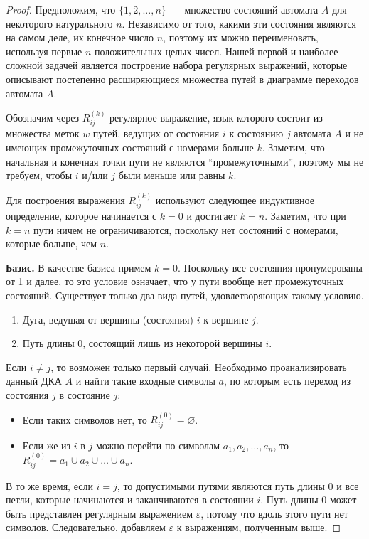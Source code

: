 \documentclass[a4paper,12pt]{article}
\begin{document}
	\begin{proof}
		Предположим, что \(\{1, 2, ..., n\}\)~--- множество состояний автомата \(A\) для некоторого натурального \(n\). Независимо от того, какими эти состояния являются на самом деле, их конечное число \(n\), поэтому их можно переименовать, используя первые \(n\) положительных целых чисел. Нашей первой и наиболее сложной задачей является построение набора регулярных выражений, которые описывают постепенно расширяющиеся множества путей в диаграмме переходов автомата \(A\).
		
		Обозначим через \(R^{(k)}_{ij}\) регулярное выражение, язык которого состоит из множества меток \(w\) путей, ведущих от состояния \(i\) к состоянию \(j\) автомата \(A\) и не имеющих промежуточных состояний с номерами больше \(k\). Заметим, что начальная и конечная точки пути не являются ``промежуточными'', поэтому мы не требуем, чтобы \(i\) и/или \(j\) были меньше или равны \(k\).
		
		Для построения выражения \(R^{(k)}_{ij}\) используют следующее индуктивное определение, которое начинается с \(k = 0\) и достигает \(k = n\). Заметим, что при \(k = n\) пути ничем не ограничиваются, поскольку нет состояний с номерами, которые больше, чем \(n\).
		
		\textbf{Базис.} В качестве базиса примем \(k = 0\). Поскольку все состояния пронумерованы от 1 и далее, то это условие означает, что у пути вообще нет промежуточных состояний. Существует только два вида путей, удовлетворяющих такому условию.
		\begin{enumerate}
			\item Дуга, ведущая от вершины (состояния) \(i\) к вершине \(j\).
			\item Путь длины 0, состоящий лишь из некоторой вершины \(i\).
		\end{enumerate}
		Если \(i \neq j\), то возможен только первый случай. Необходимо проанализировать данный ДКА \(A\) и найти такие входные символы \(a\), по которым есть переход из состояния \(j\) в состояние \(j\):
		\begin{itemize}
			\item Если таких символов нет, то \(R^{(0)}_{ij} = \varnothing\).
			
			\item Если же из \(i\) в \(j\) можно перейти по символам \(a_1, a_2, \ldots, a_n\), то \(R^{(0)}_{ij} = a_1 \cup a_2 \cup \ldots \cup a_n\).
		\end{itemize}
		
		В то же время, если \(i = j\), то допустимыми путями являются путь длины 0 и все петли, которые начинаются и заканчиваются в состоянии \(i\). Путь длины 0 может быть представлен регулярным выражением \(\varepsilon\), потому что вдоль этого пути нет символов. Следовательно, добавляем \(\varepsilon\) к выражениям, полученным выше.
		

\end{proof}
\end{document}
